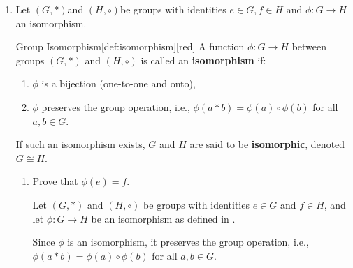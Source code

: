 \begin{enumerate}
\begin{enumerate}
\begin{subprove}
      It is claimed that $A B$ is not a subgroup of $S_3$.
      To show this, consider the elements $(12)$ and $(13)$ in $A B$.
      Their product is $(12) (13) = (123)$, which is in $A B$.
      However, consider $(13) (12) = (132)$.
      It is verified that $(132) \notin A B = \{e, (12), (13), (123)\}$.
      
      If $A B$ were a subgroup, then for any $x, y \in A B$, the product $x y$ would be in $A B$.
      However, $(13) (12) = (132) \notin A B$, which contradicts the closure property.
      
      Therefore, $A B$ is not a subgroup of $S_3$, and hence the statement that $A B$ is always a subgroup of $G$ is disproved.
    \end{subprove}
  \end{enumerate}


  
  \newpage


  \item Let $(G, *)$and $(H, \circ)$be groups with identities $e \in G, f \in H$ and $\phi: G \rightarrow H$ an isomorphism.
  \begin{define}{Group Isomorphism}[def:isomorphism][red]
    A function $\phi: G \to H$ between groups $(G, *)$ and $(H, \circ)$ is called an \textbf{isomorphism} if:
    \begin{enumerate}
      \item $\phi$ is a bijection (one-to-one and onto),
      \item $\phi$ preserves the group operation, i.e., $\phi(a * b) = \phi(a) \circ \phi(b)$ for all $a, b \in G$.
    \end{enumerate}
    If such an isomorphism exists, $G$ and $H$ are said to be \textbf{isomorphic}, denoted $G \cong H$.
  \end{define}
  \begin{enumerate}
    \item Prove that $\phi(e)=f$.
    \begin{subprove}
      Let $(G, *)$ and $(H, \circ)$ be groups with identities $e \in G$ and $f \in H$, 
      and let $\phi: G \to H$ be an isomorphism as defined in .
      
      Since $\phi$ is an isomorphism, it preserves the group operation, i.e., 
      $\phi(a * b) = \phi(a) \circ \phi(b)$ for all $a, b \in G$.
      

\end{subprove}
\end{enumerate}
\end{enumerate}
